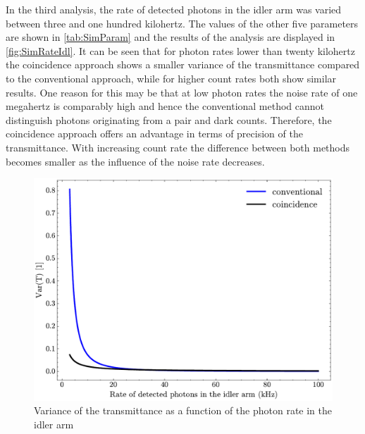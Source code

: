 In the third analysis, the rate of detected photons in the idler arm was varied between three and one hundred kilohertz. The values of the other five parameters are shown in \autoref{tab:SimParam} and the results of the analysis are displayed in \autoref{fig:SimRateIdl}. It can be seen that for photon rates lower than twenty kilohertz the coincidence approach shows a smaller variance of the transmittance compared to the conventional approach, while for higher count rates both show similar results. One reason for this may be that at low photon rates the noise rate of one megahertz is comparably high and hence the conventional method cannot distinguish photons originating from a pair and dark counts. Therefore, the coincidence approach offers an advantage in terms of precision of the transmittance. With increasing count rate the difference between both methods becomes smaller as the influence of the noise rate decreases. 
\begin{figure}[tb!]
	\centering
	\includegraphics[width=.7\textwidth]{Images/SimulationSweepRateIdl.pdf}
	\caption{Variance of the transmittance as a function of the photon rate in the idler arm}
	\label{fig:SimRateIdl}
\end{figure}
